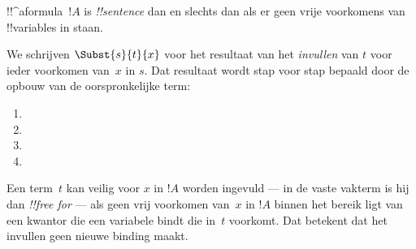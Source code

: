 \documentclass[openany]{memoir}
\begin{document}
\begin{defn}
!!^a{formula}~$!A$ is  \emph{!!{sentence}} dan en
slechts dan als er geen vrije voorkomens van !!{variable}s in staan.
\end{defn}

\endgroup

\begingroup
\def\olfilename{OLP-0158}
\def\olfilepath{content/first-order-logic/syntax-and-semantics/}
\hypertarget{unit-OLP-0158}{}





\begin{defn}
We schrijven $\Subst{s}{t}{x}$ voor het resultaat van het
\emph{invullen} van $t$ voor ieder voorkomen van~$x$ in $s$. Dat
resultaat wordt stap voor stap bepaald door de opbouw van de oorspronkelijke term:
\begin{enumerate}
\item {}

\item {}

\item {}

\item{}
\end{enumerate}
\end{defn}

\begin{defn}
Een term~$t$ kan veilig voor $x$ in $!A$ worden ingevuld — in de vaste
vakterm is hij dan \emph{!!{free for}} — als geen vrij voorkomen van~$x$
in $!A$ binnen het bereik ligt van een kwantor die een variabele bindt
die in~$t$ voorkomt. Dat betekent dat het invullen geen nieuwe binding maakt.
\end{defn}
\end{document}
